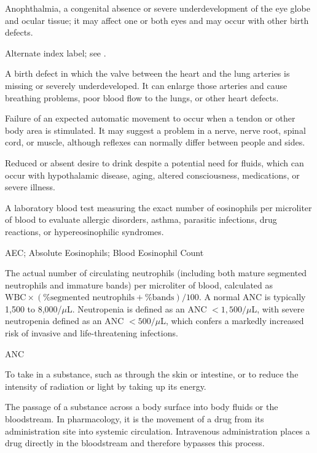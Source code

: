  Anophthalmia, a congenital absence or severe underdevelopment of the eye globe and ocular tissue; it may affect one or both eyes and may occur with other birth defects.

 Alternate index label; see .

 A birth defect in which the valve between the heart and the lung arteries is missing or severely underdeveloped. It can enlarge those arteries and cause breathing problems, poor blood flow to the lungs, or other heart defects.

 Failure of an expected automatic movement to occur when a tendon or other body area is stimulated. It may suggest a problem in a nerve, nerve root, spinal cord, or muscle, although reflexes can normally differ between people and sides.

 Reduced or absent desire to drink despite a potential need for fluids, which can occur with hypothalamic disease, aging, altered consciousness, medications, or severe illness.

 A laboratory blood test measuring the exact number of eosinophils per microliter of blood to evaluate allergic disorders, asthma, parasitic infections, drug reactions, or hypereosinophilic syndromes.

\synonyms
AEC; Absolute Eosinophils; Blood Eosinophil Count

 The actual number of circulating neutrophils (including both mature segmented neutrophils and immature bands) per microliter of blood, calculated as $\text{WBC} \times (\% \text{segmented neutrophils} + \% \text{bands}) / 100$. A normal ANC is typically 1,500 to 8,000/$\mu$L. Neutropenia is defined as an ANC $< 1,500/\mu$L, with severe neutropenia defined as an ANC $< 500/\mu$L, which confers a markedly increased risk of invasive and life-threatening infections.

\synonyms
ANC

 To take in a substance, such as through the skin or intestine, or to reduce the intensity of radiation or light by taking up its energy.

 The passage of a substance across a body surface into body fluids or the bloodstream. In
pharmacology, it is the movement of a drug from its administration site into systemic circulation. Intravenous
administration places a drug directly in the bloodstream and therefore bypasses this process.

